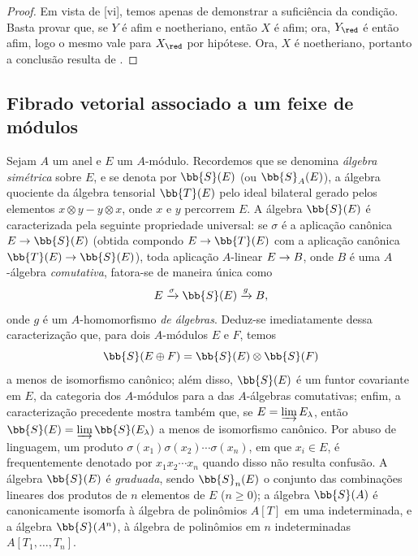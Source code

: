 \documentclass[oneside,10pt]{amsart}
\makeatletter
\renewcommand{\geq}{\geqslant}
\newcommand{\ega@arrow}[2]{\mathchoice{#1}{#2}{#2}{#2}}
\renewcommand{\to}{\ega@arrow{\longrightarrow}{\rightarrow}}
\newcommand{\oldpage}[2][]{\marginnote{\normalfont\footnotesize\textbf{#1}~|~#2}\ignorespaces}
\let\EGAOriginalLabel\label
\renewcommand{\label}[1]{\phantomsection\EGAOriginalLabel{#1}}
\makeatother
\begin{document}
\begin{proof}
Em vista de [vi], temos apenas de demonstrar a suficiência da condição.
Basta provar que, se $Y$ é afim e noetheriano, então $X$ é afim; ora, $Y_\red$ é então afim, logo o mesmo vale para $X_\red$ por hipótese.
Ora, $X$ é noetheriano, portanto a conclusão resulta de .
\end{proof}

\subsection{Fibrado vetorial associado a um feixe de módulos}
\label{subsection:II.1.7}

\begin{env}[1.7.1]
\label{II.1.7.1}
Sejam $A$ um anel e $E$ um $A$-módulo.
Recordemos que se denomina \emph{álgebra simétrica} sobre $E$, e se denota por $\bb{S}(E)$ (ou $\bb{S}_A(E)$), a álgebra quociente da álgebra tensorial $\bb{T}(E)$ pelo ideal bilateral gerado pelos elementos $x\otimes y-y\otimes x$, onde $x$ e $y$ percorrem $E$.
A álgebra $\bb{S}(E)$ é caracterizada pela seguinte propriedade universal: se $\sigma$ é a aplicação canônica $E\to\bb{S}(E)$ (obtida compondo $E\to\bb{T}(E)$ com a aplicação canônica $\bb{T}(E)\to\bb{S}(E)$), toda aplicação $A$-linear $E\to B$, onde $B$ é uma $A$-álgebra \emph{comutativa}, fatora-se de maneira única como
\[
  E\xrightarrow{\sigma}\bb{S}(E)\xrightarrow{g}B,
\]
onde $g$ é um $A$-homomorfismo \emph{de álgebras}.
Deduz-se imediatamente dessa caracterização que, para dois $A$-módulos $E$ e $F$, temos
\[
  \bb{S}(E\oplus F)=\bb{S}(E)\otimes\bb{S}(F)
\]
\oldpage[II]{15}
a menos de isomorfismo canônico; além disso, $\bb{S}(E)$ é um funtor covariante em $E$, da categoria dos $A$-módulos para a das $A$-álgebras comutativas; enfim, a caracterização precedente mostra também que, se $E=\varinjlim E_\lambda$, então $\bb{S}(E)=\varinjlim\bb{S}(E_\lambda)$ a menos de isomorfismo canônico.
Por abuso de linguagem, um produto $\sigma(x_1)\sigma(x_2)\cdots\sigma(x_n)$, em que $x_i\in E$, é frequentemente denotado por $x_1x_2\cdots x_n$ quando disso não resulta confusão.
A álgebra $\bb{S}(E)$ é \emph{graduada}, sendo $\bb{S}_n(E)$ o conjunto das combinações lineares dos produtos de $n$ elementos de $E$ ($n\geq0$); a álgebra $\bb{S}(A)$ é canonicamente isomorfa à álgebra de polinômios $A[T]$ em uma indeterminada, e a álgebra $\bb{S}(A^n)$, à álgebra de polinômios em $n$ indeterminadas $A[T_1,\dots,T_n]$.
\end{env}
\end{document}

